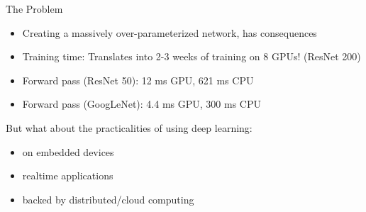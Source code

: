 \documentclass[t,xcolor=dvipsnames]{beamer}
\begin{document}
\begin{frame}{The Problem}
\begin{itemize}
    \item Creating a massively over-parameterized network, has consequences
    \item Training time: Translates into 2-3 weeks of training on 8 GPUs! (ResNet 200)
    \item Forward pass (ResNet 50): 12 ms GPU, 621 ms CPU
    \item Forward pass (GoogLeNet): 4.4 ms GPU, 300 ms CPU
\end{itemize}
\vfill
But what about the practicalities of using deep learning:
\begin{itemize}
    \item on embedded devices
    \item realtime applications
    \item backed by distributed/cloud computing
\end{itemize}
\end{frame}
\end{document}
